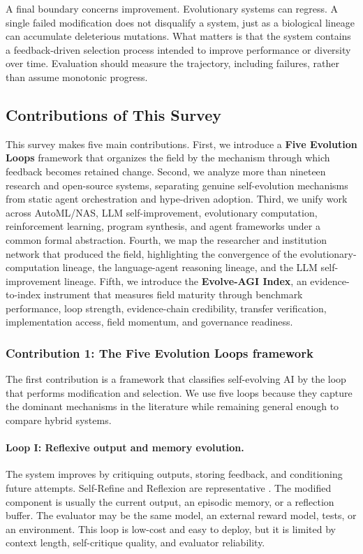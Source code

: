 A final boundary concerns improvement. Evolutionary systems can regress. A single failed modification does not disqualify a system, just as a biological lineage can accumulate deleterious mutations. What matters is that the system contains a feedback-driven selection process intended to improve performance or diversity over time. Evaluation should measure the trajectory, including failures, rather than assume monotonic progress.

\subsection{Contributions of This Survey}
\label{subsec:intro-contributions}

This survey makes five main contributions. First, we introduce a \textbf{Five Evolution Loops} framework that organizes the field by the mechanism through which feedback becomes retained change. Second, we analyze more than nineteen research and open-source systems, separating genuine self-evolution mechanisms from static agent orchestration and hype-driven adoption. Third, we unify work across AutoML/NAS, LLM self-improvement, evolutionary computation, reinforcement learning, program synthesis, and agent frameworks under a common formal abstraction. Fourth, we map the researcher and institution network that produced the field, highlighting the convergence of the evolutionary-computation lineage, the language-agent reasoning lineage, and the LLM self-improvement lineage. Fifth, we introduce the \textbf{Evolve-AGI Index}, an evidence-to-index instrument that measures field maturity through benchmark performance, loop strength, evidence-chain credibility, transfer verification, implementation access, field momentum, and governance readiness.

\subsubsection{Contribution 1: The Five Evolution Loops framework}

The first contribution is a framework that classifies self-evolving AI by the loop that performs modification and selection. We use five loops because they capture the dominant mechanisms in the literature while remaining general enough to compare hybrid systems.

\paragraph{Loop I: Reflexive output and memory evolution.} The system improves by critiquing outputs, storing feedback, and conditioning future attempts. Self-Refine and Reflexion are representative \cite{selfrefine2023,reflexion2023}. The modified component is usually the current output, an episodic memory, or a reflection buffer. The evaluator may be the same model, an external reward model, tests, or an environment. This loop is low-cost and easy to deploy, but it is limited by context length, self-critique quality, and evaluator reliability.

